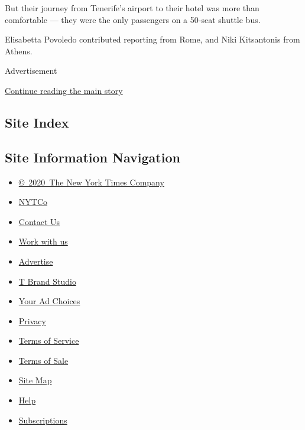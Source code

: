 But their journey from Tenerife's airport to their hotel was more than
comfortable --- they were the only passengers on a 50-seat shuttle bus.

Elisabetta Povoledo contributed reporting from Rome, and Niki
Kitsantonis from Athens.

Advertisement

\protect\hyperlink{after-bottom}{Continue reading the main story}

\hypertarget{site-index}{%
\subsection{Site Index}\label{site-index}}

\hypertarget{site-information-navigation}{%
\subsection{Site Information
Navigation}\label{site-information-navigation}}

\begin{itemize}
\tightlist
\item
  \href{https://help.nytimes3xbfgragh.onion/hc/en-us/articles/115014792127-Copyright-notice}{©~2020~The
  New York Times Company}
\end{itemize}

\begin{itemize}
\tightlist
\item
  \href{https://www.nytco.com/}{NYTCo}
\item
  \href{https://help.nytimes3xbfgragh.onion/hc/en-us/articles/115015385887-Contact-Us}{Contact
  Us}
\item
  \href{https://www.nytco.com/careers/}{Work with us}
\item
  \href{https://nytmediakit.com/}{Advertise}
\item
  \href{http://www.tbrandstudio.com/}{T Brand Studio}
\item
  \href{https://www.nytimes3xbfgragh.onion/privacy/cookie-policy\#how-do-i-manage-trackers}{Your
  Ad Choices}
\item
  \href{https://www.nytimes3xbfgragh.onion/privacy}{Privacy}
\item
  \href{https://help.nytimes3xbfgragh.onion/hc/en-us/articles/115014893428-Terms-of-service}{Terms
  of Service}
\item
  \href{https://help.nytimes3xbfgragh.onion/hc/en-us/articles/115014893968-Terms-of-sale}{Terms
  of Sale}
\item
  \href{https://spiderbites.nytimes3xbfgragh.onion}{Site Map}
\item
  \href{https://help.nytimes3xbfgragh.onion/hc/en-us}{Help}
\item
  \href{https://www.nytimes3xbfgragh.onion/subscription?campaignId=37WXW}{Subscriptions}
\end{itemize}
